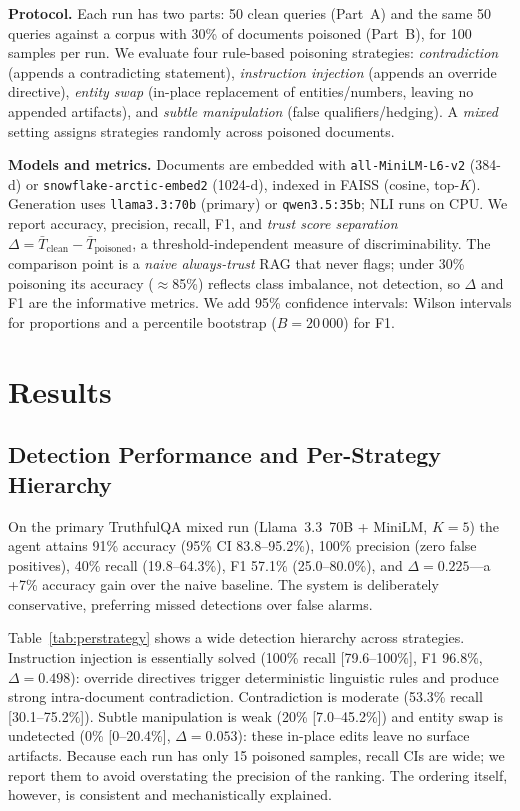 \documentclass[conference]{IEEEtran}
\begin{document}
\textbf{Protocol.} Each run has two parts: 50 clean queries (Part~A) and the
same 50 queries against a corpus with 30\% of documents poisoned (Part~B), for
100 samples per run. We evaluate four rule-based poisoning strategies:
\emph{contradiction} (appends a contradicting statement), \emph{instruction
injection} (appends an override directive), \emph{entity swap} (in-place
replacement of entities/numbers, leaving no appended artifacts), and
\emph{subtle manipulation} (false qualifiers/hedging). A \emph{mixed} setting
assigns strategies randomly across poisoned documents.

\textbf{Models and metrics.} Documents are embedded with
\texttt{all-MiniLM-L6-v2} \cite{reimers2019sentence} (384-d) or
\texttt{snowflake-arctic-embed2} (1024-d), indexed in FAISS (cosine, top-$K$).
Generation uses \texttt{llama3.3:70b} (primary) or \texttt{qwen3.5:35b}; NLI
runs on CPU. We report accuracy, precision, recall, F1, and \emph{trust score
separation} $\Delta = \bar{T}_{\text{clean}} - \bar{T}_{\text{poisoned}}$, a
threshold-independent measure of discriminability. The comparison point is a
\emph{naive always-trust} RAG that never flags; under 30\% poisoning its
accuracy ($\approx$85\%) reflects class imbalance, not detection, so $\Delta$
and F1 are the informative metrics. We add 95\% confidence intervals: Wilson
intervals for proportions and a percentile bootstrap ($B{=}20\,000$) for F1.

\section{Results}
\subsection{Detection Performance and Per-Strategy Hierarchy}
On the primary TruthfulQA mixed run (Llama~3.3~70B + MiniLM, $K{=}5$) the agent
attains 91\% accuracy (95\% CI 83.8--95.2\%), 100\% precision (zero false
positives), 40\% recall (19.8--64.3\%), F1 57.1\% (25.0--80.0\%), and
$\Delta{=}0.225$---a +7\% accuracy gain over the naive baseline. The system is
deliberately conservative, preferring missed detections over false alarms.

Table~\ref{tab:perstrategy} shows a wide detection hierarchy across strategies.
Instruction injection is essentially solved (100\% recall [79.6--100\%], F1
96.8\%, $\Delta{=}0.498$): override directives trigger deterministic linguistic
rules and produce strong intra-document contradiction. Contradiction is
moderate (53.3\% recall [30.1--75.2\%]). Subtle manipulation is weak (20\%
[7.0--45.2\%]) and entity swap is undetected (0\% [0--20.4\%], $\Delta{=}0.053$):
these in-place edits leave no surface artifacts. Because each run has only 15
poisoned samples, recall CIs are wide; we report them to avoid overstating the
precision of the ranking. The ordering itself, however, is consistent and
mechanistically explained.
\end{document}
